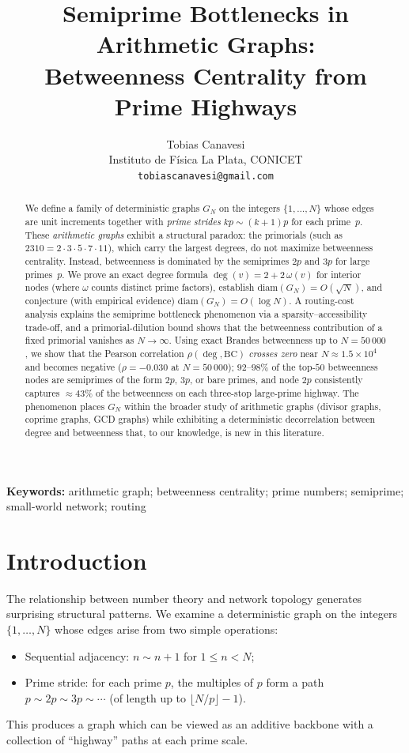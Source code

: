 \documentclass[11pt]{article}
\title{Semiprime Bottlenecks in Arithmetic Graphs:\\Betweenness Centrality from Prime Highways}
\author{Tobias Canavesi\\[4pt]
\small Instituto de Física La Plata, CONICET\\
\small \texttt{tobiascanavesi@gmail.com}}
\date{}
\theoremstyle{plain}
\theoremstyle{definition}
\begin{document}
\maketitle

\begin{abstract}
We define a family of deterministic graphs $G_N$ on the integers $\{1, \ldots, N\}$
whose edges are unit increments together with \emph{prime strides} $kp \sim (k+1)p$ for each prime~$p$.
These \emph{arithmetic graphs} exhibit a structural paradox: the primorials
(such as $2310 = 2 \cdot 3 \cdot 5 \cdot 7 \cdot 11$), which carry the largest degrees, do not maximize betweenness centrality.
Instead, betweenness is dominated by the semiprimes $2p$ and $3p$ for large primes~$p$.
We prove an exact degree formula $\deg(v) = 2 + 2\,\omega(v)$ for interior nodes (where $\omega$ counts distinct prime factors),
establish $\mathrm{diam}(G_N) = O(\sqrt{N})$, and conjecture (with empirical evidence) $\mathrm{diam}(G_N) = O(\log N)$.
A routing-cost analysis explains the semiprime bottleneck phenomenon via a sparsity--accessibility trade-off,
and a primorial-dilution bound shows that the betweenness contribution of a fixed primorial vanishes as $N \to \infty$.
Using exact Brandes betweenness up to $N = 50\,000$, we show that the Pearson correlation
$\rho(\deg, \mathrm{BC})$ \emph{crosses zero} near $N \approx 1.5 \times 10^4$ and becomes negative
($\rho = -0.030$ at $N = 50\,000$); $92$--$98\%$ of the top-$50$ betweenness nodes are semiprimes of the form $2p$, $3p$, or bare primes,
and node $2p$ consistently captures $\approx 43\%$ of the betweenness on each three-stop large-prime highway.
The phenomenon places $G_N$ within the broader study of arithmetic graphs (divisor graphs, coprime graphs, GCD graphs)
while exhibiting a deterministic decorrelation between degree and betweenness that, to our knowledge, is new in this literature.
\end{abstract}

\noindent\textbf{Keywords:} arithmetic graph; betweenness centrality; prime numbers; semiprime; small-world network; routing


\section{Introduction}

The relationship between number theory and network topology generates surprising structural patterns.
We examine a deterministic graph on the integers $\{1,\ldots,N\}$ whose edges arise from two simple operations:
\begin{itemize}
\item Sequential adjacency: $n \sim n + 1$ for $1 \le n < N$;
\item Prime stride: for each prime $p$, the multiples of $p$ form a path $p \sim 2p \sim 3p \sim \cdots$ (of length up to $\lfloor N/p \rfloor - 1$).
\end{itemize}
This produces a graph which can be viewed as an additive backbone with a collection of ``highway'' paths at each prime scale.
\end{document}
